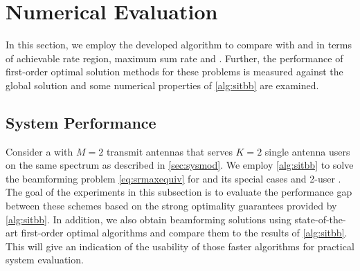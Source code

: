 \documentclass[a4paper,10pt,journal]{IEEEtran}
\begin{document}
\section{Numerical Evaluation}
\label{sec:numeval}

In this section, we employ the developed algorithm to compare  with  and  in terms of achievable rate region, maximum sum rate and . Further, the performance of first-order optimal solution methods for these problems is measured against the global solution and some numerical properties of \cref{alg:sitbb} are examined.


\subsection{System Performance}
\label{sec:numeval:system}
Consider a  with $M=2$ transmit antennas that serves $K=2$ single antenna users on the same spectrum as described in \cref{sec:sysmod}. We employ \cref{alg:sitbb} to solve the beamforming problem \cref{eq:srmaxequiv} for  and its special cases  and 2-user .
The goal of the experiments in this subsection is to evaluate the performance gap between these schemes based on the strong optimality guarantees provided by \cref{alg:sitbb}. In addition, we also obtain beamforming solutions using state-of-the-art first-order optimal algorithms and compare them to the results of \cref{alg:sitbb}. This will give an indication of the usability of those faster algorithms for practical system evaluation.
\end{document}
